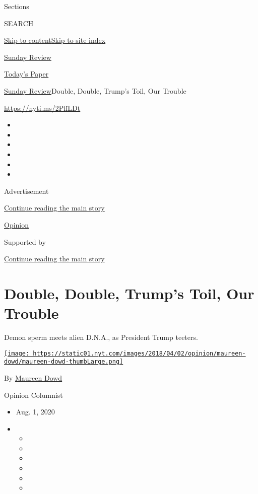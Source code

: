Sections

SEARCH

\protect\hyperlink{site-content}{Skip to
content}\protect\hyperlink{site-index}{Skip to site index}

\href{https://www.nytimes.com/section/opinion/sunday}{Sunday Review}

\href{https://myaccount.nytimes.com/auth/login?response_type=cookie\&client_id=vi}{}

\href{https://www.nytimes.com/section/todayspaper}{Today's Paper}

\href{/section/opinion/sunday}{Sunday Review}\textbar{}Double, Double,
Trump's Toil, Our Trouble

\url{https://nyti.ms/2PffLDt}

\begin{itemize}
\item
\item
\item
\item
\item
\item
\end{itemize}

Advertisement

\protect\hyperlink{after-top}{Continue reading the main story}

\href{/section/opinion}{Opinion}

Supported by

\protect\hyperlink{after-sponsor}{Continue reading the main story}

\hypertarget{double-double-trumps-toil-our-trouble}{%
\section{Double, Double, Trump's Toil, Our
Trouble}\label{double-double-trumps-toil-our-trouble}}

Demon sperm meets alien D.N.A., as President Trump teeters.

\href{https://www.nytimes.com/by/maureen-dowd}{\texttt{[image: https://static01.nyt.com/images/2018/04/02/opinion/maureen-dowd/maureen-dowd-thumbLarge.png]}}

By \href{https://www.nytimes.com/by/maureen-dowd}{Maureen Dowd}

Opinion Columnist

\begin{itemize}
\item
  Aug. 1, 2020
\item
  \begin{itemize}
  \item
  \item
  \item
  \item
  \item
  \item
  \end{itemize}
\end{itemize}

